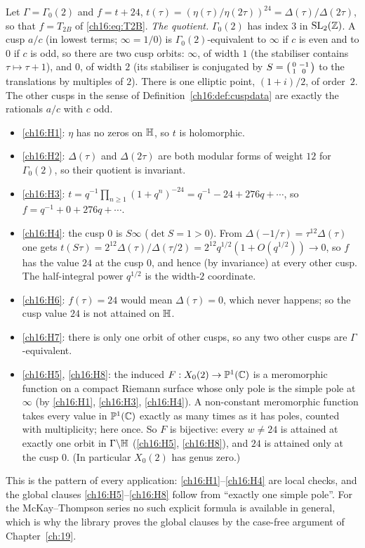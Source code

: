 \begin{example}\label{ch16:ex:gamma02}
Let $\Gamma=\Gamma_0(2)$ and $f=t+24$, $t(\tau)=(\eta(\tau)/\eta(2\tau))^{24}=\Delta(\tau)/\Delta(2\tau)$, so that
$f=T_{2B}$ of \eqref{ch16:eq:T2B}.
\emph{The quotient.}  $\Gamma_0(2)$ has index $3$ in $\mathrm{SL}_2(\mathbb{Z})$.  A cusp $a/c$ (in lowest terms; $\infty=1/0$) is
$\Gamma_0(2)$-equivalent to $\infty$ if $c$ is even and to $0$ if $c$ is odd, so there are two cusp orbits: $\infty$, of
width $1$ (the stabiliser contains $\tau\mapsto\tau+1$), and $0$, of width $2$ (its stabiliser is conjugated by
$S=\left(\begin{smallmatrix}0&-1\\1&0\end{smallmatrix}\right)$ to the translations by multiples of $2$).  There is one elliptic point, $(1+i)/2$, of
order~$2$.  The other cusps in the sense of Definition~\ref{ch16:def:cuspdata} are exactly the rationals $a/c$ with
$c$ odd.
\begin{itemize}
\item \ref{ch16:H1}: $\eta$ has no zeros on $\mathbb{H}$, so $t$ is holomorphic.
\item \ref{ch16:H2}: $\Delta(\tau)$ and $\Delta(2\tau)$ are both modular forms of weight $12$ for $\Gamma_0(2)$, so
  their quotient is invariant.
\item \ref{ch16:H3}: $t=q^{-1}\prod_{n\ge1}(1+q^n)^{-24}=q^{-1}-24+276q+\cdots$, so $f=q^{-1}+0+276q+\cdots$.
\item \ref{ch16:H4}: the cusp $0$ is $S\infty$ ($\det S=1>0$).  From $\Delta(-1/\tau)=\tau^{12}\Delta(\tau)$ one gets
  $t(S\tau)=2^{12}\Delta(\tau)/\Delta(\tau/2)=2^{12}q^{1/2}(1+O(q^{1/2}))\to0$, so $f$ has the value $24$ at the cusp
  $0$, and hence (by invariance) at every other cusp.  The half-integral power $q^{1/2}$ is the width-$2$ coordinate.
\item \ref{ch16:H6}: $f(\tau)=24$ would mean $\Delta(\tau)=0$, which never happens; so the cusp value $24$ is not
  attained on $\mathbb{H}$.
\item \ref{ch16:H7}: there is only one orbit of other cusps, so any two other cusps are $\Gamma$-equivalent.
\item \ref{ch16:H5}, \ref{ch16:H8}: the induced $F:X_0(2)\to\mathbb{P}^1({\mathbb{C}})$ is a meromorphic function on a compact
  Riemann surface whose only pole is the simple pole at $\infty$ (by \ref{ch16:H1}, \ref{ch16:H3}, \ref{ch16:H4}).  A
  non-constant meromorphic function takes every value in $\mathbb{P}^1({\mathbb{C}})$ exactly as many times as it has poles,
  counted with multiplicity; here once.  So $F$ is bijective: every $w\ne24$ is attained at exactly one orbit in
  $\Gamma\backslash\mathbb{H}$ (\ref{ch16:H5}, \ref{ch16:H8}), and $24$ is attained only at the cusp $0$.  (In
  particular $X_0(2)$ has genus zero.)
\end{itemize}
This is the pattern of every application: \ref{ch16:H1}--\ref{ch16:H4} are local checks, and the global clauses
\ref{ch16:H5}--\ref{ch16:H8} follow from ``exactly one simple pole''.  For the McKay--Thompson series no such
explicit formula is available in general, which is why the library proves the global clauses by the case-free
argument of Chapter~\ref{ch:19}.
\end{example}

